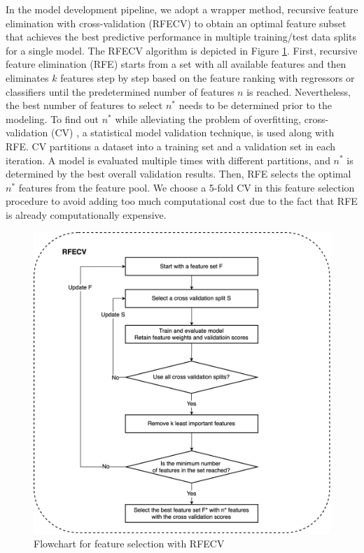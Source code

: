 In the model development pipeline, we adopt a wrapper method, recursive feature elimination \cite{feature-selection-GUYON2003} with cross-validation (RFECV) to obtain an optimal feature subset that achieves the best predictive performance in multiple training/test data splits for a single model. The RFECV algorithm is depicted in Figure \ref{fig: rfecv}. First, recursive feature elimination (RFE) starts from a set with all available features and then eliminates $k$ features step by step based on the feature ranking with regressors or classifiers until the predetermined number of features $n$ is reached. Nevertheless, the best number of features to select $n^*$ needs to be determined prior to the modeling. To find out $n^*$ while alleviating the problem of overfitting, cross-validation (CV) \cite{cv-kohavi1995study}, a statistical model validation technique, is used along with RFE. CV partitions a dataset into a training set and a validation set in each iteration. A model is evaluated multiple times with different partitions, and $n^*$ is determined by the best overall validation results. Then, RFE selects the optimal $n^*$ features from the feature pool. We choose a 5-fold CV in this feature selection procedure to avoid adding too much computational cost due to the fact that RFE is already computationally expensive.

\begin{figure}[tb]
    \centering
    \includegraphics[width=0.9\linewidth]{fig/rfecv.png}
    \caption{Flowchart for feature selection with RFECV}
    \label{fig: rfecv}
\end{figure}

